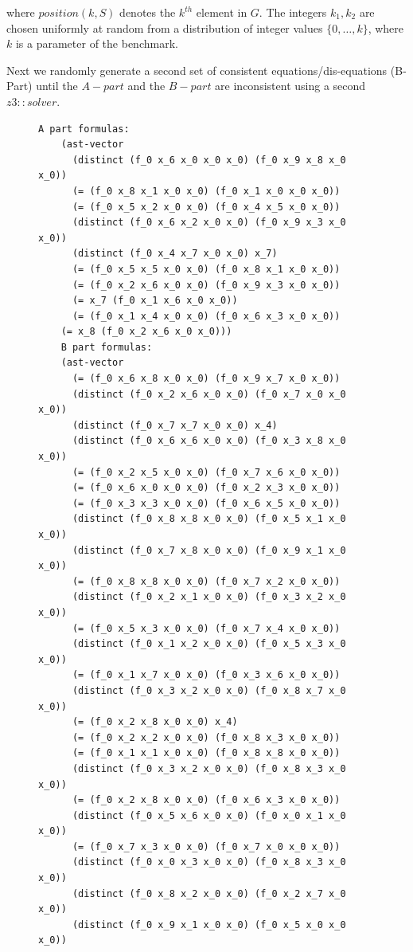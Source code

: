 where $position(k, S)$ denotes the $k^{th}$ element in $G$. The 
integers $k_1, k_2$ are chosen uniformly at random from a
distribution of integer values $\{0, \dots, k\}$, 
where $k$ is a parameter of the benchmark.

Next we randomly generate a second set of consistent 
equations/dis-equations (B-Part) until the $A-part$ and the
$B-part$ are inconsistent using a second $z3: :solver$.

\begin{figure}[!ht]
  \centering
  \begin{BVerbatim}[fontsize=\tiny]
    A part formulas:
    (ast-vector
      (distinct (f_0 x_6 x_0 x_0 x_0) (f_0 x_9 x_8 x_0 x_0))
      (= (f_0 x_8 x_1 x_0 x_0) (f_0 x_1 x_0 x_0 x_0))
      (= (f_0 x_5 x_2 x_0 x_0) (f_0 x_4 x_5 x_0 x_0))
      (distinct (f_0 x_6 x_2 x_0 x_0) (f_0 x_9 x_3 x_0 x_0))
      (distinct (f_0 x_4 x_7 x_0 x_0) x_7)
      (= (f_0 x_5 x_5 x_0 x_0) (f_0 x_8 x_1 x_0 x_0))
      (= (f_0 x_2 x_6 x_0 x_0) (f_0 x_9 x_3 x_0 x_0))
      (= x_7 (f_0 x_1 x_6 x_0 x_0))
      (= (f_0 x_1 x_4 x_0 x_0) (f_0 x_6 x_3 x_0 x_0))
    (= x_8 (f_0 x_2 x_6 x_0 x_0)))
    B part formulas:
    (ast-vector
      (= (f_0 x_6 x_8 x_0 x_0) (f_0 x_9 x_7 x_0 x_0))
      (distinct (f_0 x_2 x_6 x_0 x_0) (f_0 x_7 x_0 x_0 x_0))
      (distinct (f_0 x_7 x_7 x_0 x_0) x_4)
      (distinct (f_0 x_6 x_6 x_0 x_0) (f_0 x_3 x_8 x_0 x_0))
      (= (f_0 x_2 x_5 x_0 x_0) (f_0 x_7 x_6 x_0 x_0))
      (= (f_0 x_6 x_0 x_0 x_0) (f_0 x_2 x_3 x_0 x_0))
      (= (f_0 x_3 x_3 x_0 x_0) (f_0 x_6 x_5 x_0 x_0))
      (distinct (f_0 x_8 x_8 x_0 x_0) (f_0 x_5 x_1 x_0 x_0))
      (distinct (f_0 x_7 x_8 x_0 x_0) (f_0 x_9 x_1 x_0 x_0))
      (= (f_0 x_8 x_8 x_0 x_0) (f_0 x_7 x_2 x_0 x_0))
      (distinct (f_0 x_2 x_1 x_0 x_0) (f_0 x_3 x_2 x_0 x_0))
      (= (f_0 x_5 x_3 x_0 x_0) (f_0 x_7 x_4 x_0 x_0))
      (distinct (f_0 x_1 x_2 x_0 x_0) (f_0 x_5 x_3 x_0 x_0))
      (= (f_0 x_1 x_7 x_0 x_0) (f_0 x_3 x_6 x_0 x_0))
      (distinct (f_0 x_3 x_2 x_0 x_0) (f_0 x_8 x_7 x_0 x_0))
      (= (f_0 x_2 x_8 x_0 x_0) x_4)
      (= (f_0 x_2 x_2 x_0 x_0) (f_0 x_8 x_3 x_0 x_0))
      (= (f_0 x_1 x_1 x_0 x_0) (f_0 x_8 x_8 x_0 x_0))
      (distinct (f_0 x_3 x_2 x_0 x_0) (f_0 x_8 x_3 x_0 x_0))
      (= (f_0 x_2 x_8 x_0 x_0) (f_0 x_6 x_3 x_0 x_0))
      (distinct (f_0 x_5 x_6 x_0 x_0) (f_0 x_0 x_1 x_0 x_0))
      (= (f_0 x_7 x_3 x_0 x_0) (f_0 x_7 x_0 x_0 x_0))
      (distinct (f_0 x_0 x_3 x_0 x_0) (f_0 x_8 x_3 x_0 x_0))
      (distinct (f_0 x_8 x_2 x_0 x_0) (f_0 x_2 x_7 x_0 x_0))
      (distinct (f_0 x_9 x_1 x_0 x_0) (f_0 x_5 x_0 x_0 x_0))

\end{BVerbatim}
\end{figure}
